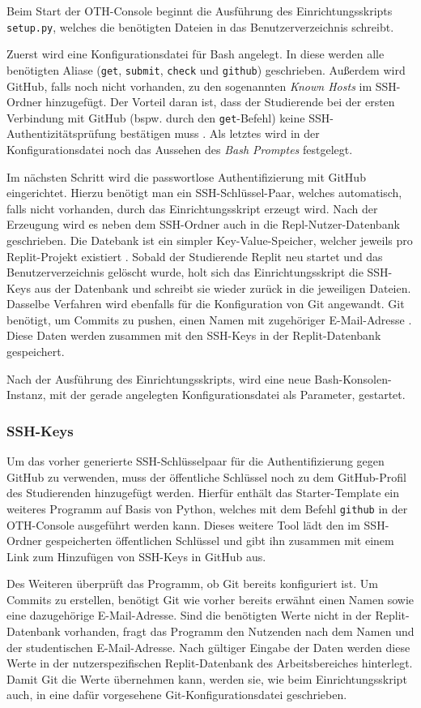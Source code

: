 Beim Start der OTH-Console beginnt die Ausführung des Einrichtungsskripts
\texttt{setup.py}, welches die benötigten Dateien in das Benutzerverzeichnis
schreibt.

Zuerst wird eine Konfigurationsdatei für Bash angelegt. In diese werden alle
benötigten Aliase (\texttt{get}, \texttt{submit}, \texttt{check} und
\texttt{github}) geschrieben. Außerdem wird GitHub, falls noch nicht vorhanden,
zu den sogenannten \emph{Known Hosts} im SSH-Ordner hinzugefügt. Der Vorteil
daran ist, dass der Studierende bei der ersten Verbindung mit GitHub (bspw. durch
den \texttt{get}-Befehl) keine SSH-Authentizitätsprüfung bestätigen muss
\parencite{ssh}. Als letztes wird in der Konfigurationsdatei noch das Aussehen
des \emph{Bash Promptes} festgelegt.

Im nächsten Schritt wird die passwortlose Authentifizierung mit GitHub
eingerichtet. Hierzu benötigt man ein SSH-Schlüssel-Paar, welches automatisch,
falls nicht vorhanden, durch das Einrichtungsskript erzeugt wird. Nach der
Erzeugung wird es neben dem SSH-Ordner auch in die Repl-Nutzer-Datenbank
geschrieben. Die Datebank ist ein simpler Key-Value-Speicher, welcher jeweils
pro Replit-Projekt existiert \parencite{replit-database}. Sobald der Studierende
Replit neu startet und das Benutzerverzeichnis gelöscht wurde, holt sich das
Einrichtungsskript die SSH-Keys aus der Datenbank und schreibt sie wieder
zurück in die jeweiligen Dateien. Dasselbe Verfahren wird ebenfalls für die
Konfiguration von Git angewandt. Git benötigt, um Commits zu pushen, einen 
Namen mit zugehöriger E-Mail-Adresse \parencite{git-config}. Diese Daten werden
zusammen mit den SSH-Keys in der Replit-Datenbank gespeichert.

Nach der Ausführung des Einrichtungsskripts, wird eine neue
Bash-Konsolen-Instanz, mit der gerade angelegten Konfigurationsdatei als
Parameter, gestartet.

\subsubsection{SSH-Keys}\label{replit-template-ssh-keys}
Um das vorher generierte SSH-Schlüsselpaar für die Authentifizierung gegen
GitHub zu verwenden, muss der öffentliche Schlüssel noch zu dem GitHub-Profil
des Studierenden hinzugefügt werden. Hierfür enthält das Starter-Template ein
weiteres Programm auf Basis von Python, welches mit dem Befehl \texttt{github}
in der OTH-Console ausgeführt werden kann. Dieses weitere Tool lädt den im
SSH-Ordner gespeicherten öffentlichen Schlüssel und gibt ihn zusammen mit einem
Link zum Hinzufügen von SSH-Keys in GitHub aus.

Des Weiteren überprüft das Programm, ob Git bereits konfiguriert ist. Um Commits
zu erstellen, benötigt Git wie vorher bereits erwähnt einen Namen sowie eine
dazugehörige E-Mail-Adresse. Sind die benötigten Werte nicht in der
Replit-Datenbank vorhanden, fragt das Programm den Nutzenden nach dem Namen und
der studentischen E-Mail-Adresse. Nach gültiger Eingabe der Daten werden diese
Werte in der nutzerspezifischen Replit-Datenbank des Arbeitsbereiches
hinterlegt. Damit Git die Werte übernehmen kann, werden sie, wie beim
Einrichtungsskript auch, in eine dafür vorgesehene Git-Konfigurationsdatei
geschrieben.